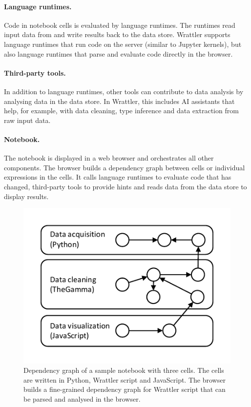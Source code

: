 \documentclass[sigplan]{acmart}\settopmatter{printfolios=true,printccs=false,printacmref=false}
\begin{document}
\paragraph{Language runtimes.} Code in notebook cells is evaluated by language runtimes.
The runtimes read input data from and write results back to the data store. Wrattler supports
language runtimes that run code on the server (similar to Jupyter kernels), but also language
runtimes that parse and evaluate code directly in the browser.

\paragraph{Third-party tools.} In addition to language runtimes, other tools can contribute
to data analysis by analysing data in the data store. In Wrattler, this includes AI assistants 
that help, for example, with data cleaning, type inference and data extraction from raw 
input data.

\paragraph{Notebook.} The notebook is displayed in a web browser and orchestrates 
all other components. The browser builds a dependency graph between cells or individual 
expressions in the cells. It calls language runtimes to evaluate code that has changed,
third-party tools to provide hints and reads data from the data store to display results.  

\begin{figure}
\includegraphics[scale=1,trim=0.5cm 0.5cm 0.5cm 0.5cm]{graph.pdf}
\caption{\small{Dependency graph of a sample notebook with three cells. The cells are written
in Python, Wrattler script and JavaScript. The browser builds a fine-grained dependency graph
for Wrattler script that can be parsed and analysed in the browser.}}
\label{fig:deps}
\vspace{-0.5em}
\end{figure}
\end{document}

